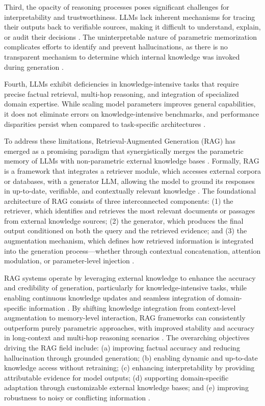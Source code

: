 \documentclass[11pt]{article}
\begin{document}
Third, the opacity of reasoning processes poses significant challenges for interpretability and trustworthiness. LLMs lack inherent mechanisms for tracing their outputs back to verifiable sources, making it difficult to understand, explain, or audit their decisions \cite{ref16}. The uninterpretable nature of parametric memorization complicates efforts to identify and prevent hallucinations, as there is no transparent mechanism to determine which internal knowledge was invoked during generation \cite{ref14}.

Fourth, LLMs exhibit deficiencies in knowledge-intensive tasks that require precise factual retrieval, multi-hop reasoning, and integration of specialized domain expertise. While scaling model parameters improves general capabilities, it does not eliminate errors on knowledge-intensive benchmarks, and performance disparities persist when compared to task-specific architectures \cite{ref17,ref18}.

To address these limitations, Retrieval-Augmented Generation (RAG) has emerged as a promising paradigm that synergistically merges the parametric memory of LLMs with non-parametric external knowledge bases \cite{ref1,ref19}. Formally, RAG is a framework that integrates a retriever module, which accesses external corpora or databases, with a generator LLM, allowing the model to ground its responses in up-to-date, verifiable, and contextually relevant knowledge \cite{ref12}. The foundational architecture of RAG consists of three interconnected components: (1) the retriever, which identifies and retrieves the most relevant documents or passages from external knowledge sources; (2) the generator, which produces the final output conditioned on both the query and the retrieved evidence; and (3) the augmentation mechanism, which defines how retrieved information is integrated into the generation process---whether through contextual concatenation, attention modulation, or parameter-level injection \cite{ref8,ref5}.

RAG systems operate by leveraging external knowledge to enhance the accuracy and credibility of generation, particularly for knowledge-intensive tasks, while enabling continuous knowledge updates and seamless integration of domain-specific information \cite{ref6}. By shifting knowledge integration from context-level augmentation to memory-level interaction, RAG frameworks can consistently outperform purely parametric approaches, with improved stability and accuracy in long-context and multi-hop reasoning scenarios \cite{ref15}. The overarching objectives driving the RAG field include: (a) improving factual accuracy and reducing hallucination through grounded generation; (b) enabling dynamic and up-to-date knowledge access without retraining; (c) enhancing interpretability by providing attributable evidence for model outputs; (d) supporting domain-specific adaptation through customizable external knowledge bases; and (e) improving robustness to noisy or conflicting information \cite{ref1,ref20}.
\end{document}
